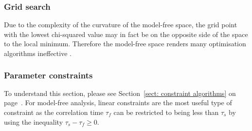 \begin{htmlonly}
\begin{htmlonly}
\subsubsection{Grid search}

Due to the complexity of the curvature of the model-free space, the grid point with the lowest chi-squared value may in fact be on the opposite side of the space to the local minimum.
Therefore the model-free space renders many optimisation algorithms ineffective \citep{dAuvergneGooley08a}.


\subsubsection{Parameter constraints}

To understand this section, please see Section~\ref{sect: constraint algorithms} on page~\pageref{sect: constraint algorithms}.
For model-free analysis, linear constraints are the most useful type of constraint as the correlation time $\tau_f$ can be restricted to being less than $\tau_s$ by using the inequality $\tau_s - \tau_f \geqslant 0$.


\end{htmlonly}
\end{htmlonly}
